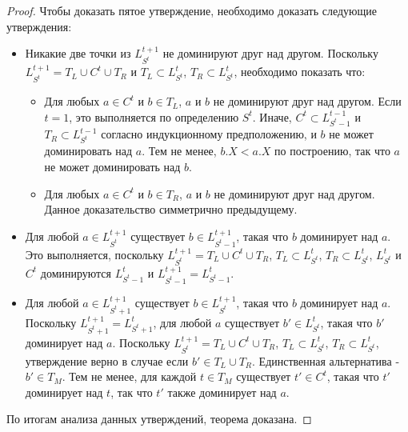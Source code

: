 \begin{proof}
Чтобы доказать пятое утверждение, необходимо доказать следующие утверждения:
\begin{itemize}
    \item Никакие две точки из $L_{S^t}^{t+1}$ не доминируют друг над другом. 
          Поскольку $L_{S^t}^{t+1} = T_L \cup C^t \cup T_R$ и $T_L \subset L_{S^t}^{t}$,
          $T_R \subset L_{S^t}^{t}$, необходимо показать что:
    \begin{itemize}
        \item Для любых $a \in C^t$ и $b \in T_L$, $a$ и $b$ не доминируют друг над другом.
              Если $t = 1$, это выполняется по определению $S^t$.
              Иначе, $C^t \subset L_{S^t - 1}^{t-1}$ и $T_R \subset L_{S^t}^{t-1}$ согласно
			  индукционному предположению, и $b$ не может доминировать над $a$. Тем не менее, 
			  $b.X < a.X$ по построению, так что $a$ не может доминировать над $b$.
        \item Для любых $a \in C^t$ и $b \in T_R$, $a$ и $b$ не доминируют друг над другом.
              Данное доказательство симметрично предыдущему.
    \end{itemize}
    \item Для любой $a \in L_{S^t}^{t+1}$ существует $b \in L_{S^t - 1}^{t+1}$, такая что
          $b$ доминирует над $a$. Это выполняется, поскольку $L_{S^t}^{t+1} = T_L \cup C^t \cup T_R$,
          $T_L \subset L_{S^t}^{t}$, $T_R \subset L_{S^t}^{t}$, $L_{S^t}^{t}$ и
          $C^t$ доминируются $L_{S^t - 1}^t$ и $L_{S^t - 1}^{t+1} = L_{S^t - 1}^t$.
    \item Для любой $a \in L_{S^t + 1}^{t+1}$ существует $b \in L_{S^t}^{t+1}$, такая что
          $b$ доминирует над $a$. Поскольку $L_{S^t + 1}^{t+1} = L_{S^t + 1}^t$, для любой $a$
          существует $b' \in L_{S^t}^t$, такая что $b'$ доминирует над $a$.
          Поскольку $L_{S^t}^{t+1} = T_L \cup C^t \cup T_R$, $T_L \subset L_{S^t}^{t}$, 
          $T_R \subset L_{S^t}^{t}$, утверждение верно в случае если $b' \in T_L \cup T_R$.
          Единственная альтернатива - $b' \in T_M$. Тем не менее, для каждой $t \in T_M$
          существует $t' \in C^t$, такая что $t'$ доминирует над $t$, так что $t'$ также 
		  доминирует над $a$.
\end{itemize}

По итогам анализа данных утверждений, теорема доказана.

\end{proof}

